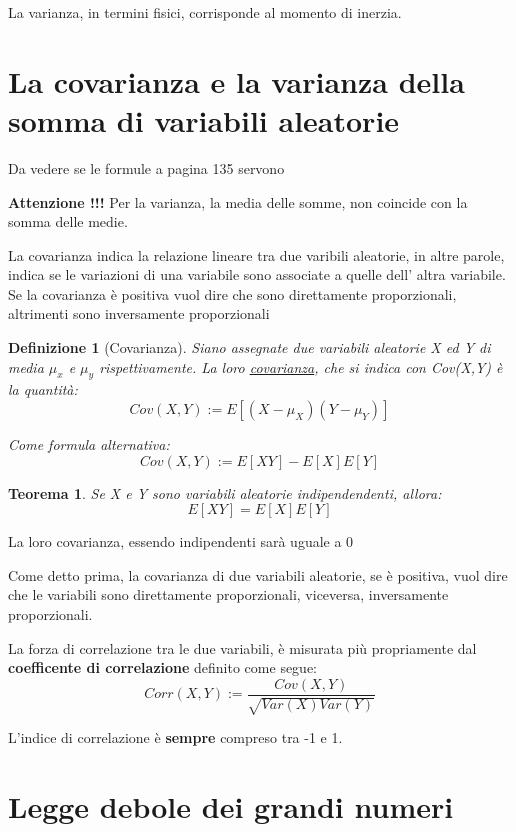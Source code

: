 \documentclass[12pt]{article}
\newtheorem{definition}{Definizione}[section]
\newtheorem{theorem}{Teorema}[section]
\begin{document}
La varianza, in termini fisici, corrisponde al momento di inerzia. 

\section{La covarianza e la varianza della somma di variabili aleatorie}

Da vedere se le formule a pagina 135 servono 

\textbf{Attenzione !!!} 
\newline
Per la varianza, la media delle somme, non coincide con la somma delle medie. 

La covarianza indica la relazione lineare tra due varibili aleatorie, in altre parole, indica
se le variazioni di una variabile sono associate a quelle dell' altra variabile. 
\newline
Se la covarianza è positiva vuol dire che sono direttamente proporzionali, altrimenti sono inversamente
proporzionali
\begin{definition}[Covarianza]
    Siano assegnate due variabili aleatorie X ed Y di media \(\mu_x\) e \(\mu_y\) rispettivamente. 
    La loro \underline{covarianza}, che si indica con Cov(X,Y) è la quantità:
    \[
    Cov(X,Y) := E[(X-\mu_X)(Y-\mu_Y)]    
    \]

    Come formula alternativa:
    \[
        Cov(X,Y) := E[XY] - E[X]E[Y]
    \]
\end{definition}

\begin{theorem}
    Se X e Y sono variabili aleatorie indipendendenti, allora:
    \[
    E[XY] = E[X]E[Y]    
    \]
\end{theorem}

La loro covarianza, essendo indipendenti sarà uguale a 0 

Come detto prima, la covarianza di due variabili aleatorie, se è positiva, vuol dire
che le variabili sono direttamente proporzionali, viceversa, inversamente proporzionali. 

La forza di correlazione tra le due variabili, è misurata più propriamente dal
\textbf{coefficente di correlazione} definito come segue: 
\[
Corr(X,Y) := \frac{Cov(X,Y)}{\sqrt{Var(X)Var(Y)}}    
\]

L'indice di correlazione è \textbf{sempre} compreso tra -1 e 1.

\section{Legge debole dei grandi numeri}
\end{document}
